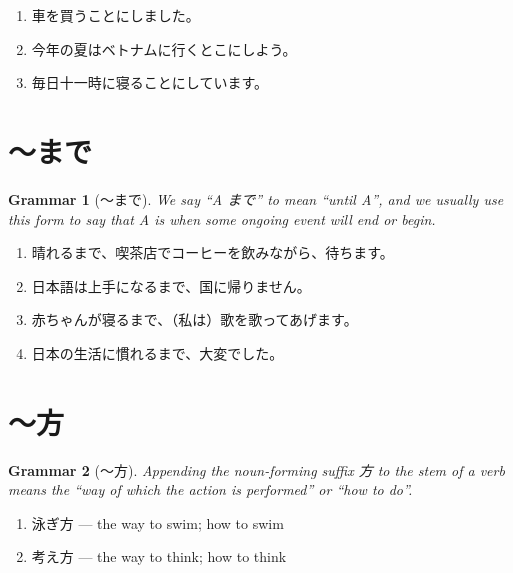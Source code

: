 \documentclass[notoc,notitlepage]{tufte-book}
\newtheorem{grammar}{\faBook Grammar}
\begin{document}
\begin{eg}
  \begin{enumerate}
    \item 車を買うことにしました。
    \item 今年の夏はベトナムに行くとこにしよう。
    \item 毎日十一時に寝ることにしています。
  \end{enumerate}
\end{eg}


\section{〜まで}%
\label{sec:made}

\begin{grammar}[〜まで]\label{grammar:_made}
  We say ``A まで'' to mean ``until A'', and we usually use this form
  to say that A is when some ongoing event will end or begin.
\end{grammar}

\begin{eg}
  \begin{enumerate}
    \item 晴れるまで、喫茶店でコーヒーを飲みながら、待ちます。
    \item 日本語は上手になるまで、国に帰りません。
    \item 赤ちゃんが寝るまで、（私は）歌を歌ってあげます。
    \item 日本の生活に慣れるまで、大変でした。
  \end{enumerate}
\end{eg}


\section{〜方}%
\label{sec:kata}

\begin{grammar}[〜方]\label{grammar:_kata}
  Appending the noun-forming suffix 方 to the stem of a verb
  means the ``way of which the action is performed'' or ``how to do''.
\end{grammar}

\begin{eg}
  \begin{enumerate}
    \item 泳ぎ方 --- the way to swim; how to swim
    \item 考え方 --- the way to think; how to think
  \end{enumerate}
\end{eg}
\end{document}
